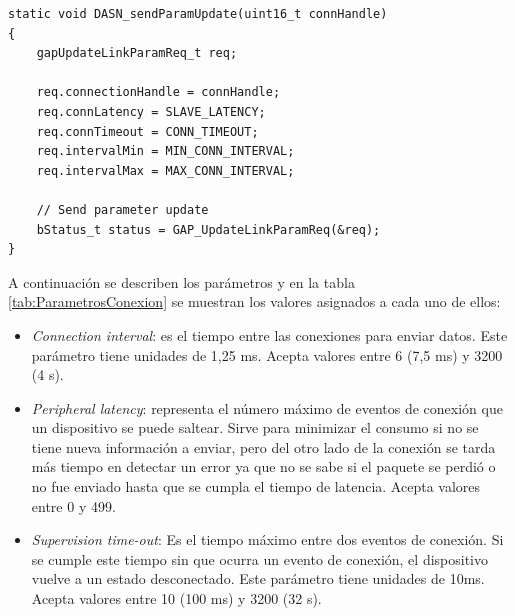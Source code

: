 \begin{lstlisting}[caption= Parámetros de conexión , label=codigo:ParametroConn]	
static void DASN_sendParamUpdate(uint16_t connHandle)
{
    gapUpdateLinkParamReq_t req;

    req.connectionHandle = connHandle;
    req.connLatency = SLAVE_LATENCY;
    req.connTimeout = CONN_TIMEOUT;
    req.intervalMin = MIN_CONN_INTERVAL;
    req.intervalMax = MAX_CONN_INTERVAL;

    // Send parameter update
    bStatus_t status = GAP_UpdateLinkParamReq(&req);
}
\end{lstlisting}

A continuación se describen los parámetros y en la tabla \ref{tab:ParametrosConexion} se muestran los valores asignados a cada uno de ellos:
\begin{itemize}
\item \textit{Connection interval}: es el tiempo entre las conexiones para enviar datos. Este parámetro tiene unidades de 1,25 ms. Acepta valores entre 6 (7,5 ms) y 3200 (4 s).

\item \textit{Peripheral latency}: representa el número máximo de eventos de conexión que un dispositivo se puede saltear. Sirve para minimizar el consumo si no se tiene nueva información a enviar, pero del otro lado de la conexión se tarda más tiempo en detectar un error ya que no se sabe si el paquete se perdió o no fue enviado hasta que se cumpla el tiempo de latencia. Acepta valores entre 0 y 499.

\item \textit{Supervision time-out}: Es el tiempo máximo entre dos eventos de conexión. Si se cumple este tiempo sin que ocurra un evento de conexión, el dispositivo vuelve a un estado desconectado. Este parámetro tiene unidades de 10ms. Acepta valores entre 10 (100 ms) y 3200 (32 s).
\end{itemize}

